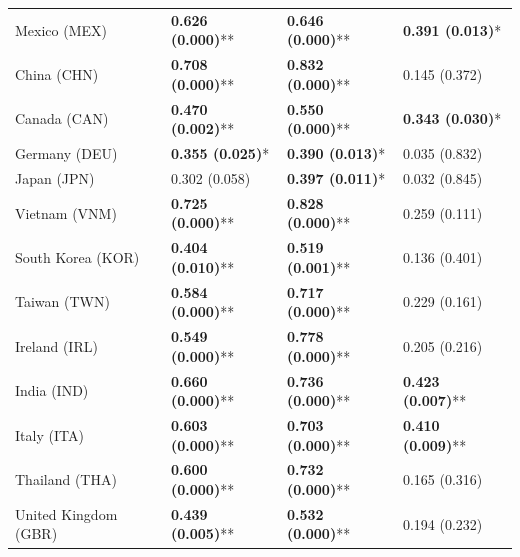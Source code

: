 \begin{longtable}{p{5cm}p{3cm}p{3cm}p{5cm}}
Mexico (MEX) & \textcolor{atlLime600}{\textbf{0.626 (0.000)}**} & \textcolor{atlLime600}{\textbf{0.646 (0.000)}**} & \textcolor{atlLime600}{\textbf{0.391 (0.013)}*} \\
China (CHN) & \textcolor{atlLime600}{\textbf{0.708 (0.000)}**} & \textcolor{atlLime600}{\textbf{0.832 (0.000)}**} & \textcolor{atlOrange600}{0.145 (0.372)} \\
Canada (CAN) & \textcolor{atlLime600}{\textbf{0.470 (0.002)}**} & \textcolor{atlLime600}{\textbf{0.550 (0.000)}**} & \textcolor{atlLime600}{\textbf{0.343 (0.030)}*} \\
Germany (DEU) & \textcolor{atlLime600}{\textbf{0.355 (0.025)}*} & \textcolor{atlLime600}{\textbf{0.390 (0.013)}*} & \textcolor{atlOrange600}{0.035 (0.832)} \\
Japan (JPN) & \textcolor{atlOrange600}{0.302 (0.058)} & \textcolor{atlLime600}{\textbf{0.397 (0.011)}*} & \textcolor{atlOrange600}{0.032 (0.845)} \\
Vietnam (VNM) & \textcolor{atlLime600}{\textbf{0.725 (0.000)}**} & \textcolor{atlLime600}{\textbf{0.828 (0.000)}**} & \textcolor{atlOrange600}{0.259 (0.111)} \\
South Korea (KOR) & \textcolor{atlLime600}{\textbf{0.404 (0.010)}**} & \textcolor{atlLime600}{\textbf{0.519 (0.001)}**} & \textcolor{atlOrange600}{0.136 (0.401)} \\
Taiwan (TWN) & \textcolor{atlLime600}{\textbf{0.584 (0.000)}**} & \textcolor{atlLime600}{\textbf{0.717 (0.000)}**} & \textcolor{atlOrange600}{0.229 (0.161)} \\
Ireland (IRL) & \textcolor{atlLime600}{\textbf{0.549 (0.000)}**} & \textcolor{atlLime600}{\textbf{0.778 (0.000)}**} & \textcolor{atlOrange600}{0.205 (0.216)} \\
India (IND) & \textcolor{atlLime600}{\textbf{0.660 (0.000)}**} & \textcolor{atlLime600}{\textbf{0.736 (0.000)}**} & \textcolor{atlLime600}{\textbf{0.423 (0.007)}**} \\
Italy (ITA) & \textcolor{atlLime600}{\textbf{0.603 (0.000)}**} & \textcolor{atlLime600}{\textbf{0.703 (0.000)}**} & \textcolor{atlLime600}{\textbf{0.410 (0.009)}**} \\
Thailand (THA) & \textcolor{atlLime600}{\textbf{0.600 (0.000)}**} & \textcolor{atlLime600}{\textbf{0.732 (0.000)}**} & \textcolor{atlOrange600}{0.165 (0.316)} \\
United Kingdom (GBR) & \textcolor{atlLime600}{\textbf{0.439 (0.005)}**} & \textcolor{atlLime600}{\textbf{0.532 (0.000)}**} & \textcolor{atlOrange600}{0.194 (0.232)} \\

\end{longtable}
